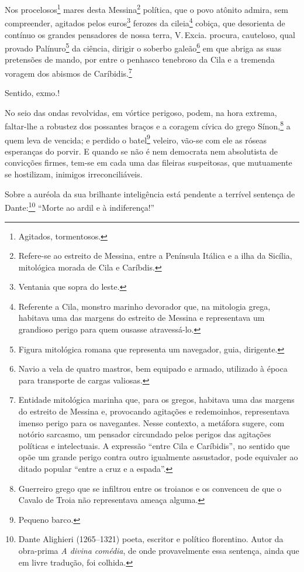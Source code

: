 Nos procelosos\footnote{Agitados, tormentosos.} mares desta
Messina\footnote{Refere-se ao estreito de Messina, entre a Península
Itálica e a ilha da Sicília, mitológica morada de Cila e Caríbdis.}
política, que o povo atônito admira, sem compreender, agitados pelos
euros\footnote{Ventania que sopra do leste.} ferozes da
cileia\footnote{Referente a Cila, monstro marinho devorador que, na
  mitologia grega, habitava uma das margens do estreito de Messina e
  representava um grandioso perigo para quem ousasse atravessá-lo.}
cobiça, que desorienta de contínuo os grandes pensadores de nossa terra,
V.\,Excia. procura, cauteloso, qual provado Palínuro\footnote{
  Figura mitológica romana que representa um navegador, guia,
  dirigente.} da ciência, dirigir o soberbo galeão\footnote{Navio a
  vela de quatro mastros, bem equipado e armado, utilizado à época para
  transporte de cargas valiosas.} em que abriga as suas pretensões de
mando, por entre o penhasco tenebroso da Cila e a tremenda voragem dos abismos de
Caríbidis.\footnote{Entidade mitológica marinha que, para os gregos, %
  habitava uma das margens do estreito de Messina e, provocando
  agitações e redemoinhos, representava imenso perigo para os
  navegantes. Nesse contexto, a metáfora sugere, com notório sarcasmo,
  um pensador circundado pelos perigos das agitações políticas e
  intelectuais. A expressão ``entre Cila e Caríbidis'', no sentido que
  opõe um grande perigo contra outro igualmente assustador, pode
  equivaler ao ditado popular ``entre a cruz e a espada''.}

Sentido, exmo.!

No seio das ondas revolvidas, em vórtice perigoso, podem, na hora
extrema, faltar-lhe a robustez dos possantes braços e a coragem cívica
do grego Sínon,\footnote{Guerreiro grego que se infiltrou entre os
  troianos e os convenceu de que o Cavalo de Troia não representava
  ameaça alguma.} a quem leva de vencida; e perdido o batel\footnote{
  Pequeno barco.} veleiro, vão-se com ele as róseas esperanças do
porvir. E quando se não é nem democrata nem absolutista de convicções
firmes, tem-se em cada uma das fileiras suspeitosas, que mutuamente se
hostilizam, inimigos irreconciliáveis.

Sobre a auréola da sua brilhante inteligência está pendente a terrível
sentença de Dante:\footnote{Dante Alighieri (1265--1321) poeta,
  escritor e político florentino. Autor da obra-prima \emph{A divina
  comédia}, de onde provavelmente essa sentença, ainda que em livre
  tradução, foi colhida.} ``Morte ao ardil e à indiferença!''

